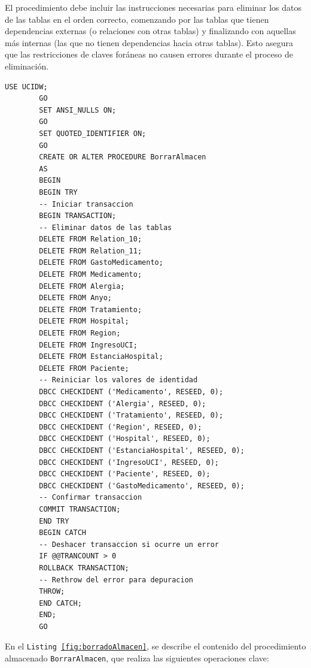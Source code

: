 \documentclass{article}
\begin{document}
	El procedimiento debe incluir las instrucciones necesarias para eliminar los datos de las tablas en el orden correcto, comenzando por las tablas que tienen dependencias externas (o relaciones con otras tablas) y finalizando con aquellas más internas (las que no tienen dependencias hacia otras tablas). Esto asegura que las restricciones de claves foráneas no causen errores durante el proceso de eliminación.
	
	\begin{lstlisting}[style=ddlstyle, label=fig:borradoAlmacen,caption=Borrado del Almacen de UCI]
		USE UCIDW;
		GO
		SET ANSI_NULLS ON;
		GO
		SET QUOTED_IDENTIFIER ON;
		GO
		CREATE OR ALTER PROCEDURE BorrarAlmacen	
		AS
		BEGIN
		BEGIN TRY
		-- Iniciar transaccion
		BEGIN TRANSACTION;
		-- Eliminar datos de las tablas
		DELETE FROM Relation_10;
		DELETE FROM Relation_11;
		DELETE FROM GastoMedicamento;
		DELETE FROM Medicamento;
		DELETE FROM Alergia;
		DELETE FROM Anyo;
		DELETE FROM Tratamiento;
		DELETE FROM Hospital;
		DELETE FROM Region;
		DELETE FROM IngresoUCI;
		DELETE FROM EstanciaHospital;
		DELETE FROM Paciente;
		-- Reiniciar los valores de identidad
		DBCC CHECKIDENT ('Medicamento', RESEED, 0);
		DBCC CHECKIDENT ('Alergia', RESEED, 0);
		DBCC CHECKIDENT ('Tratamiento', RESEED, 0);
		DBCC CHECKIDENT ('Region', RESEED, 0);
		DBCC CHECKIDENT ('Hospital', RESEED, 0);
		DBCC CHECKIDENT ('EstanciaHospital', RESEED, 0);
		DBCC CHECKIDENT ('IngresoUCI', RESEED, 0);
		DBCC CHECKIDENT ('Paciente', RESEED, 0);
		DBCC CHECKIDENT ('GastoMedicamento', RESEED, 0);
		-- Confirmar transaccion
		COMMIT TRANSACTION;
		END TRY
		BEGIN CATCH
		-- Deshacer transaccion si ocurre un error
		IF @@TRANCOUNT > 0
		ROLLBACK TRANSACTION;
		-- Rethrow del error para depuracion
		THROW;
		END CATCH;
		END;
		GO
	\end{lstlisting}
	
	
	En el \texttt{Listing \ref{fig:borradoAlmacen}}, se describe el contenido del procedimiento almacenado \texttt{BorrarAlmacen}, que realiza las siguientes operaciones clave:
	
\end{document}
